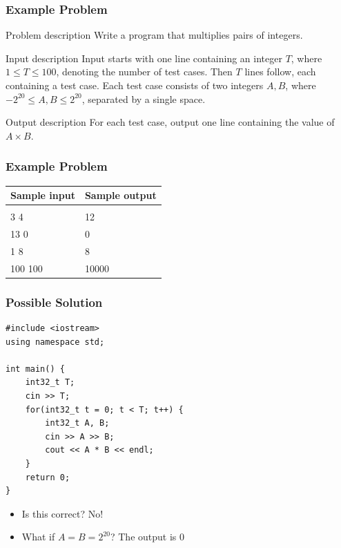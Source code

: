 \documentclass{beamer}
\begin{document}
\begin{frame}[plain]
	\frametitle{Example Problem}
	\begin{block}{Problem description}
    		Write a program that multiplies pairs of integers.
    \end{block}

    \vspace{10pt}
    
    \begin{block}{Input description}
    		Input starts with one line containing an integer $T$, where $1\leq T \leq
    100$, denoting the number of test cases. Then $T$ lines follow, each
    containing a test case. Each test case consists of two integers $A,B$,
    where $-2^{20} \leq A,B \leq 2^{20}$, separated by a single space.
    \end{block}

    \vspace{10pt}
    
    \begin{block}{Output description}
    		For each test case, output one line containing the value of $A\times B$.
    \end{block}
\end{frame}

\begin{frame}[plain]
	\frametitle{Example Problem}
	\begin{center}
		\begin{tabular}{|l|l|}
            \hline
            {\footnotesize Sample input} & {\footnotesize Sample output} \\
            \hline
            \ttfamily
            4 &  \\
            3 4 & 12 \\
            13 0 & 0 \\
            1 8 & 8 \\
            100 100 & 10000 \\
            \hline
        \end{tabular}
    \end{center}
\end{frame}

\begin{frame}
    \frametitle{Possible Solution}
	\begin{scriptsize}
        \begin{verbatim}
#include <iostream>
using namespace std;

int main() {
    int32_t T;
    cin >> T;
    for(int32_t t = 0; t < T; t++) {
        int32_t A, B;
        cin >> A >> B;
        cout << A * B << endl;
    }
    return 0;
}
        \end{verbatim}
    \end{scriptsize}
    \begin{itemize}
       \item<2-> Is this correct?  {\alert{No!}}
       \item<3-> What if $A = B = 2^{20}$?  {The output is $0$ }
    \end{itemize}
\end{frame}
\end{document}
